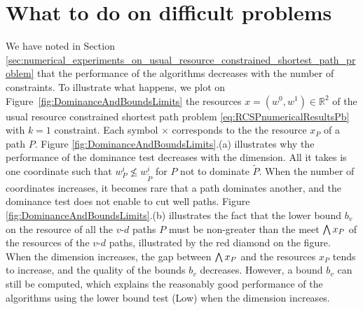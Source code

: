 \documentclass[11pt]{amsart}
\theoremstyle{plain}
\theoremstyle{remark}
\def\R{\mathbb{R}}
\newcommand{\re}{x}
\begin{document}
\section{What to do on difficult problems} \label{sec:what_to_do_on_difficult_problems}

We have noted in Section \ref{sec:numerical_experiments_on_usual_resource_constrained_shortest_path_problem} that the performance of the algorithms decreases with the number of constraints. To illustrate what happens, we plot on Figure~\ref{fig:DominanceAndBoundsLimits} the resources $x = (w^{0},w^{1}) \in \R^{2}$ of the usual resource constrained shortest path problem \eqref{eq:RCSPnumericalResultsPb} with $k=1$ constraint. Each symbol $\times$ corresponds to the the resource $x_{P}$ of a path $P$. Figure \ref{fig:DominanceAndBoundsLimits}.(a) illustrates why the performance of the dominance test decreases with the dimension. All it takes is one coordinate such that $w_{P}^{i}\nleq w_{\tilde{P}}^{i}$ for $P$ not to dominate $\tilde{P}$. When the number of coordinates increases, it becomes rare that a path dominates another, and the dominance test does not enable to cut well paths. Figure \ref{fig:DominanceAndBoundsLimits}.(b) illustrates the fact that the lower bound $b_{v}$ on the resource of all the $v$-$d$ paths $P$ must be non-greater than the meet $\bigmeet \re_{P}$ of the resources of the $v$-$d$ paths, illustrated by the red diamond on the figure. When the dimension increases, the gap between $\bigmeet \re_{P}$ and the resources $\re_{P}$ tends to increase, and the quality of the bounds $b_{v}$ decreases. However, a bound $b_{v}$ can still be computed, which explains the reasonably good performance of the algorithms using the lower bound test (Low) when the dimension increases.
\end{document}
